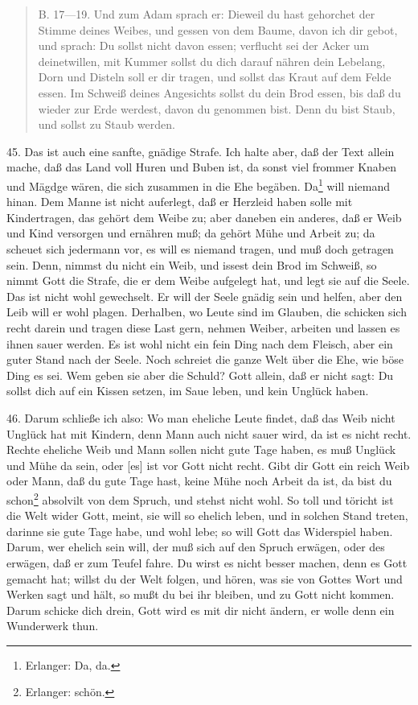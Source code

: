 \begin{quote}
B. 17—19. Und zum Adam sprach er: Dieweil du hast gehorchet der Stimme deines Weibes, und gessen von dem Baume, davon ich dir gebot, und sprach: Du sollst nicht davon essen; verflucht sei der Acker um deinetwillen, mit Kummer sollst du dich darauf nähren dein Lebelang, Dorn und Disteln soll er dir tragen, und sollst das Kraut auf dem Felde essen. Im Schweiß deines Angesichts sollst du dein Brod essen, bis daß du wieder zur Erde werdest, davon du genommen bist. Denn du bist Staub, und sollst zu Staub werden.
\end{quote}

45. Das ist auch eine sanfte, gnädige Strafe. Ich halte aber, daß der Text allein mache, daß das Land voll Huren und Buben ist, da sonst viel frommer Knaben und Mägdge wären, die sich zusammen in die Ehe begäben. Da\footnote{Erlanger: Da, da.} will niemand hinan. Dem Manne ist nicht auferlegt, daß er Herzleid haben solle mit Kindertragen, das gehört dem Weibe zu; aber daneben ein anderes, daß er Weib und Kind versorgen und ernähren muß; da gehört Mühe und Arbeit zu; da scheuet sich jedermann vor, es will es niemand tragen, und muß doch getragen sein. Denn, nimmst du nicht ein Weib, und issest dein Brod im Schweiß, so nimmt Gott die Strafe, die er dem Weibe aufgelegt hat, und legt sie auf die Seele. Das ist nicht wohl gewechselt. Er will der Seele gnädig sein und helfen, aber den Leib will er wohl plagen. Derhalben, wo Leute sind im Glauben, die schicken sich recht darein und tragen diese Last gern, nehmen Weiber, arbeiten und lassen es ihnen sauer werden. Es ist wohl nicht ein fein Ding nach dem Fleisch, aber ein guter Stand nach der Seele. Noch schreiet die ganze Welt über die Ehe, wie böse Ding es sei. Wem geben sie aber die Schuld? Gott allein, daß er nicht sagt: Du sollst dich auf ein Kissen setzen, im Saue leben, und kein Unglück haben.

46. Darum schließe ich also: Wo man eheliche Leute findet, daß das Weib nicht Unglück hat mit Kindern, denn Mann auch nicht sauer wird, da ist es nicht recht. Rechte eheliche Weib und Mann sollen nicht gute Tage haben, es muß Unglück und Mühe da sein, oder [es] ist vor Gott nicht recht. Gibt dir Gott ein reich Weib oder Mann, daß du gute Tage hast, keine Mühe noch Arbeit da ist, da bist du schon\footnote{Erlanger: schön.} absolvilt von dem Spruch, und stehst nicht wohl. So toll und töricht ist die Welt wider Gott, meint, sie will so ehelich leben, und in solchen Stand treten, darinne sie gute Tage habe, und wohl lebe; so will Gott das Widerspiel haben. Darum, wer ehelich sein will, der muß sich auf den Spruch erwägen, oder des erwägen, daß er zum Teufel fahre. Du wirst es nicht besser machen, denn es Gott gemacht hat; willst du der Welt folgen, und hören, was sie von Gottes Wort und Werken sagt und hält, so mußt du bei ihr bleiben, und zu Gott nicht kommen. Darum schicke dich drein, Gott wird es mit dir nicht ändern, er wolle denn ein Wunderwerk thun.

